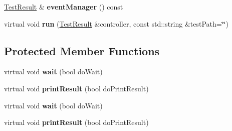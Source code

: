 \begin{DoxyCompactItemize}
\item 
\hypertarget{class_text_test_runner_afa50f45ea60892db3cf0b128c06a1629}{\hyperlink{class_test_result}{Test\+Result} \& {\bfseries event\+Manager} () const }\label{class_text_test_runner_afa50f45ea60892db3cf0b128c06a1629}

\item 
\hypertarget{class_text_test_runner_a361eaa340138edf3659a9fcb813c3b5d}{virtual void {\bfseries run} (\hyperlink{class_test_result}{Test\+Result} \&controller, const std\+::string \&test\+Path=\char`\"{}\char`\"{})}\label{class_text_test_runner_a361eaa340138edf3659a9fcb813c3b5d}

\end{DoxyCompactItemize}
\subsection*{Protected Member Functions}
\begin{DoxyCompactItemize}
\item 
\hypertarget{class_text_test_runner_acaedfb853cba2b7eff33bc012413d052}{virtual void {\bfseries wait} (bool do\+Wait)}\label{class_text_test_runner_acaedfb853cba2b7eff33bc012413d052}

\item 
\hypertarget{class_text_test_runner_a2218622eb745ab4725cb9c5931e93a0e}{virtual void {\bfseries print\+Result} (bool do\+Print\+Result)}\label{class_text_test_runner_a2218622eb745ab4725cb9c5931e93a0e}

\item 
\hypertarget{class_text_test_runner_a5b192f9419f5d1e6ebe9abd4755da140}{virtual void {\bfseries wait} (bool do\+Wait)}\label{class_text_test_runner_a5b192f9419f5d1e6ebe9abd4755da140}

\item 
\hypertarget{class_text_test_runner_aa01e5dee4cdad860ee7154329918f9ac}{virtual void {\bfseries print\+Result} (bool do\+Print\+Result)}\label{class_text_test_runner_aa01e5dee4cdad860ee7154329918f9ac}

\end{DoxyCompactItemize}
